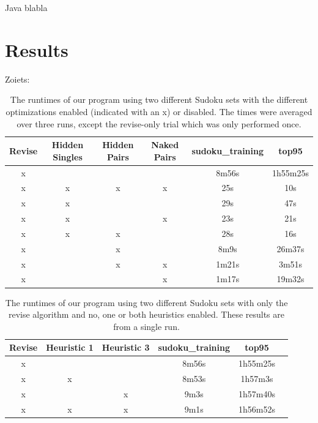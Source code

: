\documentclass[11pt]{article} %
\begin{document}
Java blabla

\section{Results}

Zoiets:

\begin{table}
\begin{center}
\begin{tabular}{c c c c c c}
\hline
 Revise & Hidden Singles & Hidden Pairs & Naked Pairs & sudoku\_training & top95 \\
\hline
x &  &  &  & 8m56s & 1h55m25s \\ %
x & x & x & x & 25s & 10s \\ %
x & x &  &  & 29s & 47s \\ %
x & x &  & x & 23s & 21s \\ %
x & x & x &  & 28s & 16s \\ %
x &   & x &  & 8m9s & 26m37s \\ %
x &   & x & x & 1m21s & 3m51s \\ %
x &  &  & x & 1m17s & 19m32s \\ %
\hline
\end{tabular}
\end{center}
\caption{The runtimes of our program using two different Sudoku sets with the different optimizations enabled (indicated with an x) or disabled. The times were averaged over three runs, except the revise-only trial which was only performed once.}
\end{table}

\begin{table}
\begin{center}
\begin{tabular}{c c c c c c}
\hline
 Revise & Heuristic 1 & Heuristic 3 & sudoku\_training & top95 \\
\hline
x &  &  & 8m56s & 1h55m25s \\ %
x & x &  & 8m53s & 1h57m3s \\ %
x &  & x & 9m3s & 1h57m40s \\ %
x & x & x & 9m1s & 1h56m52s \\ %
\hline
\end{tabular}
\end{center}
\caption{The runtimes of our program using two different Sudoku sets with only the revise algorithm and no, one or both heuristics enabled. These results are from a single run.}
\end{table}
\end{document}
